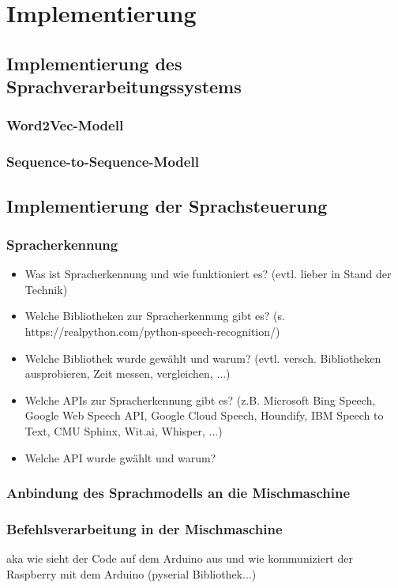 \chapter{Implementierung}
\section{Implementierung des Sprachverarbeitungssystems}
\subsection{Word2Vec-Modell}
\subsection{Sequence-to-Sequence-Modell}
\section{Implementierung der Sprachsteuerung}
\subsection{Spracherkennung}
\begin{itemize}
    \item Was ist Spracherkennung und wie funktioniert es? (evtl. lieber in Stand der Technik)
    \item Welche Bibliotheken zur Spracherkennung gibt es? (s. https://realpython.com/python-speech-recognition/)
    \item Welche Bibliothek wurde gewählt und warum? (evtl. versch. Bibliotheken ausprobieren, Zeit messen, vergleichen, ...)
    \item Welche APIs zur Spracherkennung gibt es? (z.B. Microsoft Bing Speech, Google Web Speech API, Google Cloud Speech, Houndify, IBM Speech to Text, CMU Sphinx, Wit.ai, Whisper, ...)
    \item Welche API wurde gwählt und warum?
\end{itemize}
\subsection{Anbindung des Sprachmodells an die Mischmaschine}
\subsection{Befehlsverarbeitung in der Mischmaschine}
aka wie sieht der Code auf dem Arduino aus und wie kommuniziert der Raspberry mit dem Arduino (pyserial Bibliothek...)
\endinput


